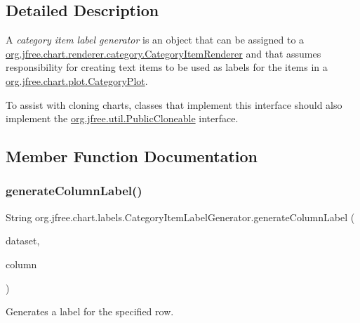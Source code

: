\subsection{Detailed Description}
A {\itshape category item label generator} is an object that can be assigned to a \mbox{\hyperlink{interfaceorg_1_1jfree_1_1chart_1_1renderer_1_1category_1_1_category_item_renderer}{org.\+jfree.\+chart.\+renderer.\+category.\+Category\+Item\+Renderer}} and that assumes responsibility for creating text items to be used as labels for the items in a \mbox{\hyperlink{classorg_1_1jfree_1_1chart_1_1plot_1_1_category_plot}{org.\+jfree.\+chart.\+plot.\+Category\+Plot}}. 

To assist with cloning charts, classes that implement this interface should also implement the \mbox{\hyperlink{}{org.\+jfree.\+util.\+Public\+Cloneable}} interface. 

\subsection{Member Function Documentation}
\mbox{\label{interfaceorg_1_1jfree_1_1chart_1_1labels_1_1_category_item_label_generator_a5c9725076b50f97656bcec07b4ac744e}} 
\subsubsection{\texorpdfstring{generate\+Column\+Label()}{generateColumnLabel()}}
{\footnotesize\ttfamily String org.\+jfree.\+chart.\+labels.\+Category\+Item\+Label\+Generator.\+generate\+Column\+Label (\begin{DoxyParamCaption}\item[{\mbox{\hyperlink{interfaceorg_1_1jfree_1_1data_1_1category_1_1_category_dataset}{Category\+Dataset}}}]{dataset,  }\item[{int}]{column }\end{DoxyParamCaption})}

Generates a label for the specified row.


